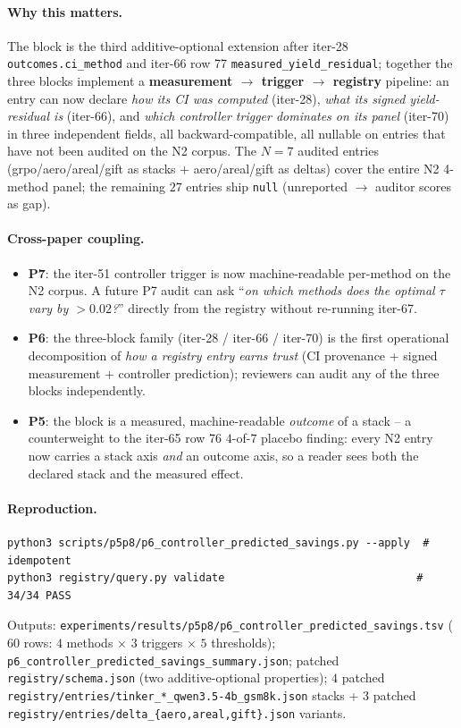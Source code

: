 \paragraph{Why this matters.}
The block is the third additive-optional extension after iter-28
\texttt{outcomes.ci\_method} and iter-66 row 77
\texttt{measured\_yield\_residual}; together the three blocks implement a
\textbf{measurement $\to$ trigger $\to$ registry} pipeline: an entry can now
declare \emph{how its CI was computed} (iter-28), \emph{what its signed
yield-residual is} (iter-66), and \emph{which controller trigger dominates on
its panel} (iter-70) in three independent fields, all backward-compatible,
all nullable on entries that have not been audited on the N2 corpus. The
$N{=}7$ audited entries (grpo/aero/areal/gift as stacks + aero/areal/gift as
deltas) cover the entire N2 4-method panel; the remaining $27$ entries ship
\texttt{null} (unreported $\to$ auditor scores as gap).

\paragraph{Cross-paper coupling.}
\begin{itemize}
  \item \textbf{P7}: the iter-51 controller trigger is now machine-readable
        per-method on the N2 corpus. A future P7 audit can ask
        ``\emph{on which methods does the optimal $\tau$ vary by $>0.02$?}''
        directly from the registry without re-running iter-67.
  \item \textbf{P6}: the three-block family (iter-28 / iter-66 / iter-70)
        is the first operational decomposition of \emph{how a registry
        entry earns trust} (CI provenance + signed measurement + controller
        prediction); reviewers can audit any of the three blocks
        independently.
  \item \textbf{P5}: the block is a measured, machine-readable
        \emph{outcome} of a stack -- a counterweight to the iter-65 row 76
        $4$-of-$7$ placebo finding: every N2 entry now carries a stack
        axis \emph{and} an outcome axis, so a reader sees both the declared
        stack and the measured effect.
\end{itemize}

\paragraph{Reproduction.}
\begin{verbatim}
python3 scripts/p5p8/p6_controller_predicted_savings.py --apply  # idempotent
python3 registry/query.py validate                              # 34/34 PASS
\end{verbatim}
Outputs: \texttt{experiments/results/p5p8/p6\_controller\_predicted\_savings.tsv}
($60$ rows: $4$ methods $\times$ $3$ triggers $\times$ $5$ thresholds);
\texttt{p6\_controller\_predicted\_savings\_summary.json}; patched
\texttt{registry/schema.json} (two additive-optional properties); $4$ patched
\texttt{registry/entries/tinker\_*\_qwen3.5-4b\_gsm8k.json} stacks + $3$
patched \texttt{registry/entries/delta\_\{aero,areal,gift\}.json} variants.
